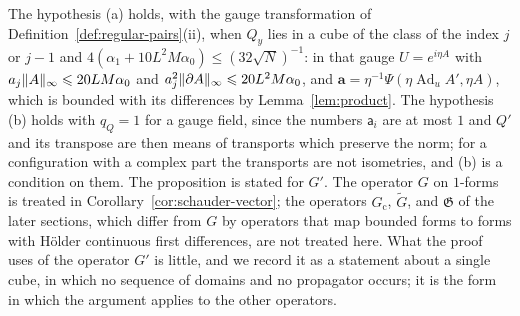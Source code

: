 \documentclass[11pt]{preprint}
\newcommand{\Ad}{\operatorname{Ad}}
\DeclarePairedDelimiter{\norm}{\lVert}{\rVert}
\numberwithin{equation}{section}
\begin{document}
The hypothesis (a) holds, with the gauge transformation of Definition~\ref{def:regular-pairs}(ii), when $Q_y$ lies in a cube of the class of the index $j$ or $j - 1$ and $4(\alpha_1 + 10L^2M\alpha_0) \leqslant (32\sqrt N)^{-1}$: in that gauge $U = e^{i\eta A}$ with $a_j\norm A_\infty\leqslant 20LM\alpha_0$ and $a_j^2\norm{\partial A}_\infty \leqslant 20L^2M\alpha_0$, and $\mathbf a = \eta^{-1}\Psi(\eta \Ad_uA', \eta A)$, which is bounded with its differences by Lemma~\ref{lem:product}. The hypothesis (b) holds with $q_Q = 1$ for a gauge field, since the numbers $\mathsf a_i$ are at most $1$ and $Q'$ and its transpose are then means of transports which preserve the norm; for a configuration with a complex part the transports are not isometries, and (b) is a condition on them. The proposition is stated for $G'$. The operator $G$ on $1$-forms is treated in Corollary~\ref{cor:schauder-vector}; the operators $G_{\mathrm c}$, $\tilde G$, and $\mathfrak G$ of the later sections, which differ from $G$ by operators that map bounded forms to forms with H\"older continuous first differences, are not treated here. What the proof uses of the operator $G'$ is little, and we record it as a statement about a single cube, in which no sequence of domains and no propagator occurs; it is the form in which the argument applies to the other operators.
\end{document}
